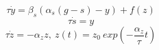 \begin{equation}
    \tau \dot{y} = \beta_{s}(\alpha_{s}(g-s)- y) + f(z)
\end{equation}
\begin{equation}
    \tau \dot{s} = y
\end{equation}
\begin{equation}
    \tau \dot{z} = -\alpha_{z} z, \ z(t) = z_{0} \ exp(-\frac{\alpha_{z}}{\tau} t)
\end{equation}
